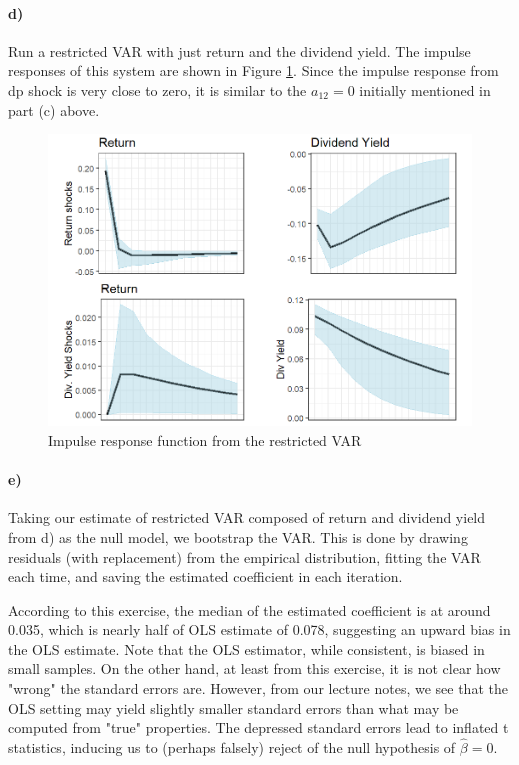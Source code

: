\documentclass[11pt,letter]{article}
\begin{document}
\paragraph{d)}

Run a restricted VAR with just return and the dividend yield. The impulse responses of this system are shown in Figure \ref{fig:restrictred_VAR}.
Since the impulse response from dp shock
is very close to zero, it is similar to the $a_{12}=0$
initially mentioned in part (c) above. 

\begin{figure}[!htb]
	\centering
	\includegraphics[scale = 0.5]{restircted_var_shock.png}
	\caption{Impulse response function from the restricted VAR}
	\label{fig:restrictred_VAR}
\end{figure}

\paragraph{e)}


Taking our estimate of restricted VAR composed of return and
dividend yield from d) as the null model, we bootstrap the VAR.
This is done by drawing residuals (with replacement) from
the empirical distribution, fitting the VAR each time,
and saving the estimated coefficient in each iteration.


According to this exercise, the median of the estimated
coefficient is at around 0.035, which is nearly
half of OLS estimate of 0.078, suggesting an upward
bias in the OLS estimate. Note that the OLS estimator, while
consistent, is biased in small samples. On the other hand, at
least from this exercise, it is not clear how "wrong" the standard errors are. However, from our lecture notes, we see that
the OLS setting may yield slightly smaller
standard errors than what may be computed from "true" properties.
The depressed standard errors lead to
inflated t statistics, inducing us
to (perhaps falsely) reject of the null hypothesis of
$\hat{\beta}=0$. 
\end{document}
